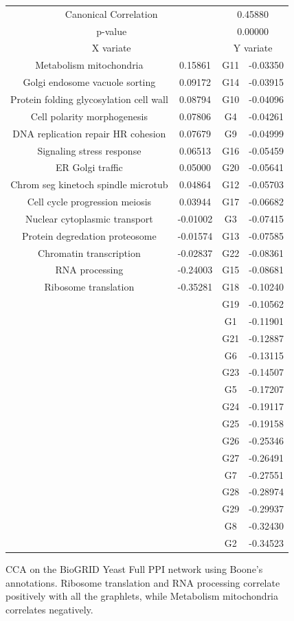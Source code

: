\begin{figure}[H]
\centering
\begin{tabular}{ c c | c c }
  \multicolumn{2}{c}{Canonical Correlation} &  \multicolumn{2}{c}{0.45880} \\
  \multicolumn{2}{c}{p-value} &  \multicolumn{2}{c}{0.00000} \\
  \hline
  \multicolumn{2}{c}{X variate} & \multicolumn{2}{c}{Y variate}\\
  \hline
 Metabolism mitochondria & 0.15861 &  G11 & -0.03350\\
 Golgi endosome vacuole sorting & 0.09172 &  G14 & -0.03915\\
 Protein folding   glycosylation cell wall & 0.08794 &  G10 & -0.04096\\
 Cell polarity morphogenesis & 0.07806 &  G4 & -0.04261\\
 DNA replication   repair HR cohesion & 0.07679 &  G9 & -0.04999\\
 Signaling stress response & 0.06513 &  G16 & -0.05459\\
 ER Golgi traffic & 0.05000 &  G20 & -0.05641\\
 Chrom  seg  kinetoch  spindle microtub  & 0.04864 &  G12 & -0.05703\\
 Cell cycle progression meiosis & 0.03944 &  G17 & -0.06682\\
 Nuclear cytoplasmic transport & -0.01002 &  G3 & -0.07415\\
 Protein degredation proteosome & -0.01574 &  G13 & -0.07585\\
 Chromatin transcription & -0.02837 &  G22 & -0.08361\\
 RNA processing & -0.24003 &  G15 & -0.08681\\
 Ribosome translation & -0.35281 &  G18 & -0.10240\\
 & &  G19 & -0.10562\\
 & &  G1 & -0.11901\\
 & &  G21 & -0.12887\\
 & &  G6 & -0.13115\\
 & &  G23 & -0.14507\\
 & &  G5 & -0.17207\\
 & &  G24 & -0.19117\\
 & &  G25 & -0.19158\\
 & &  G26 & -0.25346\\
 & &  G27 & -0.26491\\
 & &  G7 & -0.27551\\
 & &  G28 & -0.28974\\
 & &  G29 & -0.29937\\
 & &  G8 & -0.32430\\
 & &  G2 & -0.34523\\
\end{tabular}
\caption[CCA on the BioGRID Yeast Full PPI network -- Boone's annotations]{CCA on the BioGRID Yeast Full PPI network using Boone's annotations. Ribosome translation and RNA processing correlate positively with all the graphlets, while Metabolism mitochondria correlates negatively.}
\label{all_ppi10}
\end{figure}


